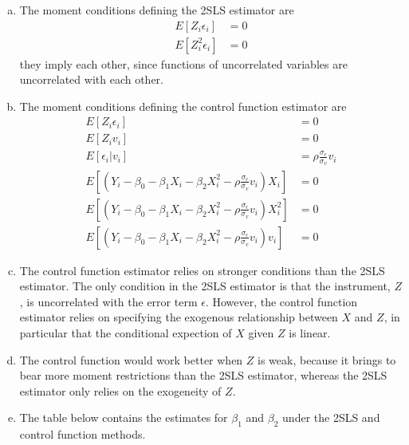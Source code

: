 \documentclass[11pt]{article}
\begin{document}
\begin{enumerate}[(a)]

	\item The moment conditions defining the 2SLS estimator are
	\begin{align*}
		E \left[ Z_i \epsilon_i \right] &= 0 \\
		E \left[ Z_i^2 \epsilon_i \right] &= 0
	\end{align*}
	they imply each other, since functions of uncorrelated variables are uncorrelated with each other.

	\item The moment conditions defining the control function estimator are
	\begin{align*}
		E \left[ Z_i \epsilon_i \right] &= 0 \\
		E \left[ Z_i v_i \right] &= 0 \\
		E \left[ \epsilon_i | v_i \right] &= \rho \frac{\sigma_{\epsilon}}{\sigma_v} v_i \\
		E \left[ (Y_i - \beta_0 - \beta_1 X_i - \beta_2 X_i^2 - \rho \frac{\sigma_{\epsilon}}{\sigma_v} v_i)X_i \right] &= 0 \\
		E \left[ (Y_i - \beta_0 - \beta_1 X_i - \beta_2 X_i^2 - \rho \frac{\sigma_{\epsilon}}{\sigma_v} v_i)X_i^2 \right] &= 0 \\
		E \left[ (Y_i - \beta_0 - \beta_1 X_i - \beta_2 X_i^2 - \rho \frac{\sigma_{\epsilon}}{\sigma_v} v_i)v_i \right] &= 0
	\end{align*}

	\item The control function estimator relies on stronger conditions than the 2SLS estimator. The only condition in the 2SLS estimator is that the instrument, $Z$, is uncorrelated with the error term $\epsilon$. However, the control function estimator relies on specifying the exogenous relationship between $X$ and $Z$, in particular that the conditional expection of $X$ given $Z$ is linear.

	\item The control function would work better when $Z$ is weak, because it brings to bear more moment restrictions than the 2SLS estimator, whereas the 2SLS estimator only relies on the exogeneity of $Z$. %

	\item

	The table below contains the estimates for $\beta_1$ and $\beta_2$ under the 2SLS and control function methods.


\end{enumerate}
\end{document}
